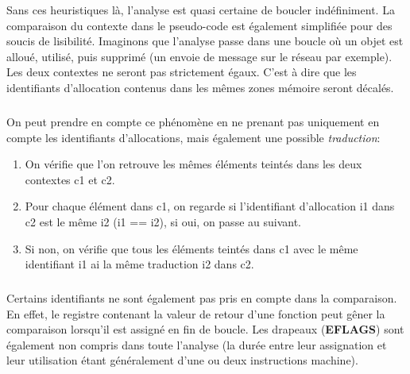 Sans ces heuristiques là, l'analyse est quasi certaine de boucler indéfiniment. La comparaison du contexte dans le pseudo-code est également simplifiée pour des soucis de lisibilité.
Imaginons que l'analyse passe dans une boucle où un objet est alloué, utilisé, puis supprimé (un envoie de message sur le réseau par exemple). Les deux contextes
ne seront pas strictement égaux. C'est à dire que les identifiants d'allocation contenus dans les mêmes zones mémoire seront décalés.
\subparagraph{}
On peut prendre en compte ce phénomène en ne prenant pas uniquement en compte les identifiants d'allocations, mais également une possible \textit{traduction}:
\begin{enumerate}
    \item On vérifie que l'on retrouve les mêmes éléments teintés dans les deux contextes c1 et c2.
    \item Pour chaque élément dans c1, on regarde si l'identifiant d'allocation i1 dans c2 est le même i2 (i1 == i2), si oui, on passe au suivant.
    \item Si non, on vérifie que tous les éléments teintés dans c1 avec le même identifiant i1 ai la même traduction i2 dans c2.
\end{enumerate}
\subparagraph{}
Certains identifiants ne sont également pas pris en compte dans la comparaison. En effet, le registre contenant la valeur de retour d'une fonction peut gêner la comparaison
lorsqu'il est assigné en fin de boucle. Les drapeaux (\textbf{EFLAGS}) sont également non compris dans toute l'analyse (la durée entre leur assignation et leur utilisation étant généralement d'une
ou deux instructions machine).


